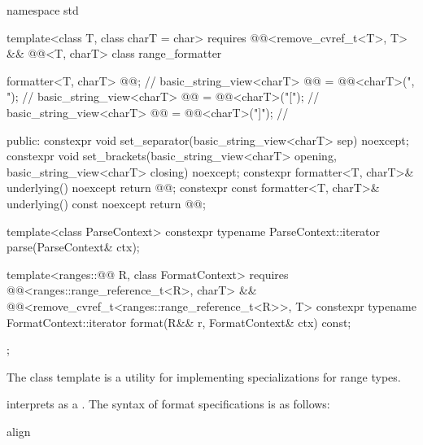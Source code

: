 %
\begin{codeblock}
namespace std {
  template<class T, class charT = char>
    requires @@<remove_cvref_t<T>, T> && @@<T, charT>
  class range_formatter {
    formatter<T, charT> @@;                                          // \expos
    basic_string_view<charT> @@ = @@<charT>(", ");      // \expos
    basic_string_view<charT> @@ = @@<charT>("["); // \expos
    basic_string_view<charT> @@ = @@<charT>("]"); // \expos

  public:
    constexpr void set_separator(basic_string_view<charT> sep) noexcept;
    constexpr void set_brackets(basic_string_view<charT> opening,
                                basic_string_view<charT> closing) noexcept;
    constexpr formatter<T, charT>& underlying() noexcept { return @@; }
    constexpr const formatter<T, charT>& underlying() const noexcept { return @@; }

    template<class ParseContext>
      constexpr typename ParseContext::iterator
        parse(ParseContext& ctx);

    template<ranges::@@ R, class FormatContext>
      requires @@<ranges::range_reference_t<R>, charT> &&
               @@<remove_cvref_t<ranges::range_reference_t<R>>, T>
      constexpr typename FormatContext::iterator
        format(R&& r, FormatContext& ctx) const;
  };
}
\end{codeblock}

\pnum
The class template  is a utility
for implementing  specializations for range types.

\pnum
{} interprets 
as a .
The syntax of format specifications is as follows:

\begin{ncbnf}
\br
        
\end{ncbnf}

\begin{ncbnf}
\br
     align
\end{ncbnf}

